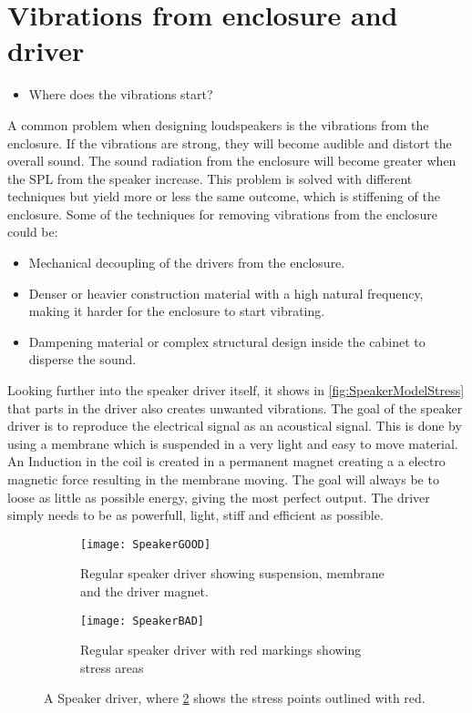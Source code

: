 \section{Vibrations from enclosure and driver}

\begin{itemize}
\item Where does the vibrations start?
\end{itemize}


A common problem when designing loudspeakers is the vibrations from the enclosure. If the vibrations are strong, they will become audible and distort the overall sound. The sound radiation from the enclosure will become greater when the \gls{SPL} from the speaker increase. This problem is solved with different techniques but yield more or less the same outcome, which is stiffening of the enclosure. Some of the techniques for removing vibrations from the enclosure could be:
\begin{itemize}
\item Mechanical decoupling of the drivers from the enclosure.
\item Denser or heavier construction material with a high natural frequency, making it harder for the enclosure to start vibrating.
\item Dampening material or complex structural design inside the cabinet to disperse the sound.
\end{itemize}

Looking further into the speaker driver itself, it shows in \autoref{fig:SpeakerModelStress} that parts in the driver also creates unwanted vibrations. The goal of the speaker driver is to reproduce the electrical signal as an acoustical signal. This is done by using a membrane which is suspended in a very light and easy to move material. An Induction in the coil is created in a permanent magnet creating a a electro magnetic force resulting in the membrane moving. The goal will always be to loose as little as possible energy, giving the most perfect output. The driver simply needs to be as powerfull, light, stiff and efficient as possible.

\begin{figure}[H]
\centering
\begin{subfigure}[t]{0.47\textwidth}
\texttt{[image: SpeakerGOOD]}
	\caption{Regular speaker driver showing suspension, membrane and the driver magnet.}
	\label{fig:regularspeaker}
\end{subfigure}
\hspace{6mm} 
\begin{subfigure}[t]{0.47\textwidth}
\texttt{[image: SpeakerBAD]}
	\caption{Regular speaker driver with red markings showing stress areas}
	\label{fig:badspeaker}
\end{subfigure}
\caption{A Speaker driver, where \ref{fig:badspeaker} shows the stress points outlined with red.}
\label{fig:SpeakerModelStress}
\end{figure}

